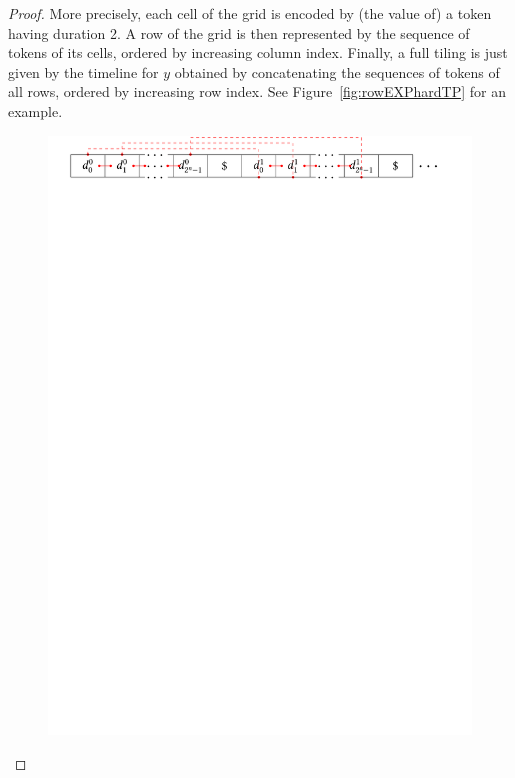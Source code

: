 \begin{proof}
More precisely,
each cell of the grid is encoded by (the value of) a token having duration 2.
A row of the grid is then represented by the sequence of tokens of its cells, ordered by increasing column index.
Finally, a full tiling is just given by the timeline for $y$ obtained by concatenating the sequences of tokens of all rows, ordered by increasing row index.
See Figure~\ref{fig:rowEXPhardTP} for an example.
\begin{figure}[tb]
    \centering
    \includegraphics[scale=0.42]{Chaps/Timelines/row1.pdf}\hspace{1pt}

\end{figure}
\end{proof}
